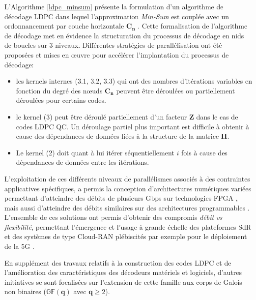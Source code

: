 \documentclass[../main.tex]{subfiles}
\begin{document}
L’Algorithme \ref{ldpc_minsum} présente la formulation d’un algorithme de décodage LDPC dans lequel l’approximation \textit{Min-Sum} est couplée avec un ordonnancement par couche horizontale $\bm{C_n}$ \cite{LDPC:HL}. Cette formalisation de l’algorithme de décodage met en évidence la structuration du processus de décodage en nids de boucles sur 3 niveaux. Différentes stratégies de parallélisation ont été proposées et mises en œuvre pour accélérer l’implantation du processus de décodage:
\begin{itemize}
    \item les kernels internes (3.1, 3.2, 3.3) qui ont des nombres d'itérations variables en fonction du degré des nœuds $\bm{C_n}$ peuvent être déroulées ou partiellement déroulées pour certains codes.
    \item le kernel (3) peut être déroulé partiellement d’un facteur \textbf{Z} dans le cas de codes LDPC QC. Un déroulage partiel plus important est difficile à obtenir à cause des dépendances de données liées à la structure de la matrice \textbf{H}.
    \item Le kernel (2) doit quant à lui itérer séquentiellement $\mathit{i}$ fois à cause des dépendances de données entre les itérations. 
\end{itemize}

L'exploitation de ces différents niveaux de parallélismes associés à des contraintes applicatives spécifiques, a permis la conception d’architectures numériques variées permettant d’atteindre des débits de plusieurs Gbps sur technologies FPGA \cite{PIGNOLY:MS,BOUTILLON}, mais aussi d’atteindre des débits similaires sur des architectures programmables \cite{BLG:REVUE:TPDS,FAIR:LDPC}. \\
L’ensemble de ces solutions ont permis d'obtenir des compromis \textit{débit vs flexibilité}, permettant l’émergence et l’usage à grande échelle des plateformes SdR \cite{SDR, SURVEY:SDR} et des systèmes de type Cloud-RAN \cite{CLOUD:RAN2,CLOUD:RAN3} plébiscités par exemple pour le déploiement de la 5G \cite{CLOUD:RAN1}. 

En supplément des travaux relatifs à la construction des codes LDPC et de l’amélioration des caractéristiques des décodeurs matériels et logiciels, d’autres initiatives se sont focalisées sur l’extension de cette famille aux corps de Galois non binaires ($\mathbb{GF}( \bm{q} )$ avec $\bm{q}\ge2$).

% 
% 
% 
% 
\end{document}
